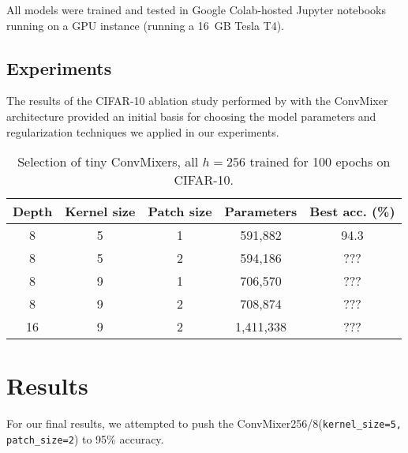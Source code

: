 \documentclass[letterpaper]{article} %
\begin{document}
All models were trained and tested in Google Colab-hosted Jupyter notebooks running on a GPU instance (running a 16 GB Tesla T4).

\subsection{Experiments}

The results of the CIFAR-10 ablation study performed by \citet{trockman2022patches} with the ConvMixer architecture provided an initial basis for choosing the model parameters and regularization techniques we applied in our experiments. 

\begin{table}
    \begin{tabular}{|c|c|c|c|c|}
        \hline
        \hline 
        Depth & Kernel size & Patch size & Parameters & Best acc. (\%) \\
        \hline
        8 & 5 & 1 & 591,882 & 94.3 \\
        8 & 5 & 2 & 594,186 & ??? \\
        8 & 9 & 1 & 706,570 & ??? \\
        8 & 9 & 2 & 708,874 & ??? \\
        16 & 9 & 2 & 1,411,338 & ??? \\
        \hline
    \end{tabular}
    \caption{Selection of tiny ConvMixers, all $h=256$ trained for 100 epochs on CIFAR-10.}
\end{table}



\section{Results}

For our final results, we attempted to push the ConvMixer256/8(\verb|kernel_size=5, patch_size=2|) to 95\% accuracy.

\appendix


\end{document}
